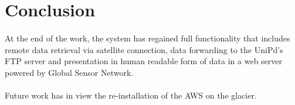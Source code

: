 \section{Conclusion}
\paragraph{}At the end of the work, the system has regained full functionality
that includes remote data retrieval via satellite connection, data forwarding
to the UniPd's FTP server and presentation in human readable form of data
in a web server powered by Global Sensor Network.
\paragraph{}Future work has in view the re-installation of the AWS on the glacier.
